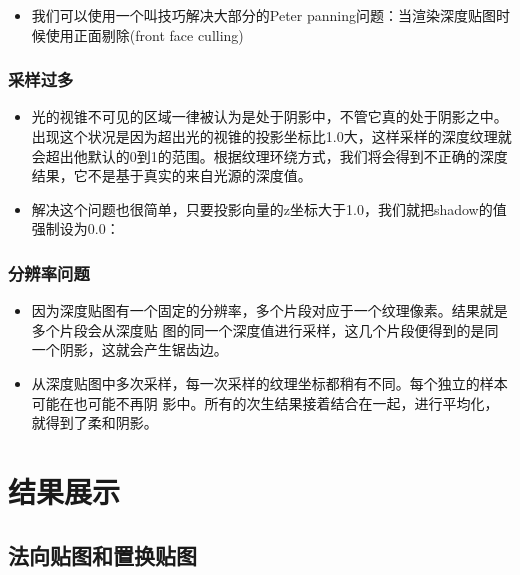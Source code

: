 \documentclass{article}
\begin{document}
	  \begin{itemize}
		\item 我们可以使用一个叫技巧解决大部分的Peter panning问题：当渲染深度贴图时候使用正面剔除(front face culling)
	\end{itemize}
	\subsubsection{采样过多}
	
		  \begin{itemize}
		\item 光的视锥不可见的区域一律被认为是处于阴影中，不管它真的处于阴影之中。出现这个状况是因为超出光的视锥的投影坐标比1.0大，这样采样的深度纹理就会超出他默认的0到1的范围。根据纹理环绕方式，我们将会得到不正确的深度结果，它不是基于真实的来自光源的深度值。
	\end{itemize}
	
	\begin{itemize}
		\item 解决这个问题也很简单，只要投影向量的z坐标大于1.0，我们就把shadow的值强制设为0.0：
	\end{itemize}
	
	\subsubsection{分辨率问题}
	
	  \begin{itemize}
		\item 因为深度贴图有一个固定的分辨率，多个片段对应于一个纹理像素。结果就是多个片段会从深度贴
		图的同一个深度值进行采样，这几个片段便得到的是同一个阴影，这就会产生锯齿边。
	\end{itemize}
	
	\begin{itemize}
		\item 从深度贴图中多次采样，每一次采样的纹理坐标都稍有不同。每个独立的样本可能在也可能不再阴
		影中。所有的次生结果接着结合在一起，进行平均化，就得到了柔和阴影。
	\end{itemize}
	
	
	\section{结果展示}
	
	\subsection{法向贴图和置换贴图}
	
\end{document}
